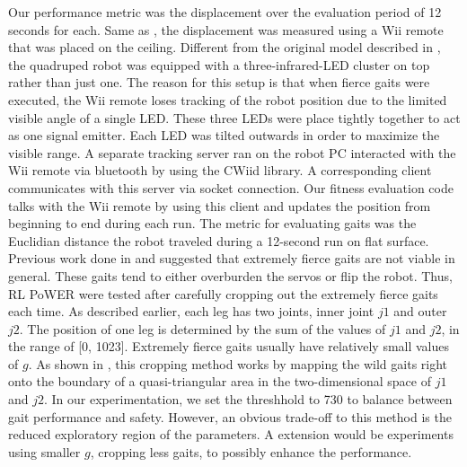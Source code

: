 Our performance metric was the displacement over the evaluation period of 12 seconds
for each. Same as \cite{yosinski2011evolving-robot-gaits}, the displacement was
measured using a Wii remote that was placed on the ceiling. Different
from the original model described in \cite{yosinski2011evolving-robot-gaits}, the quadruped robot was
equipped with a three-infrared-LED cluster on top rather than just
one. The reason for this setup is that when fierce gaits were
executed, the Wii remote loses tracking of the robot position due to
the limited visible angle of a single LED.  These three LEDs were
place tightly together to act as one signal emitter. Each LED was
tilted outwards in order to maximize the visible range. A
separate tracking server ran on the robot PC interacted with the Wii
remote via bluetooth by using the CWiid library.  A corresponding
client communicates with this server via socket connection. Our
fitness evaluation code talks with the Wii remote by using this client
and updates the position from beginning to end during each run. The
metric for evaluating gaits was the Euclidian distance the robot
traveled during a 12-second run on flat surface. Previous work done in
\cite{yosinski2011evolving-robot-gaits} and \cite{clune2009evolving-coordinated-quadruped} suggested that extremely fierce gaits are not viable in
general. These gaits tend to either overburden the servos or flip the
robot. Thus, RL PoWER were tested after carefully cropping out the
extremely fierce gaits each time. As described earlier, each leg has
two joints, inner joint $j1$ and outer $j2$. The position of one leg is
determined by the sum of the values of $j1$ and $j2$, in the range of [0, 1023]. Extremely fierce
gaits usually have relatively small values of $g$. As shown in , this cropping method works
by mapping the wild gaits right onto the boundary of a quasi-triangular area in
the two-dimensional space of $j1$ and $j2$. In our experimentation, we set the threshhold to 730 to balance between gait performance and safety. However, an obvious trade-off to this method is the reduced exploratory region of the parameters. A extension would be experiments using smaller $g$, cropping less gaits, to possibly enhance the performance.



